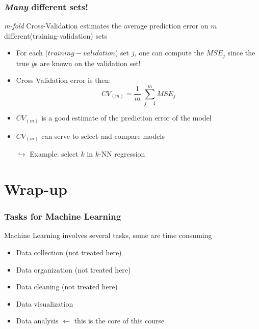 \documentclass[xcolor=x11names,compress, aspectratio=169]{beamer}
\renewcommand{\(}{\begin{columns}}
\renewcommand{\)}{\end{columns}}
\newcommand{\<}[1]{\begin{column}{#1}}
\renewcommand{\>}{\end{column}}
\begin{document}
\begin{frame}
\frametitle{\textcolor{brique}{\textit{Many} different sets!  }}
\textit{m-fold} Cross-Validation estimates the average prediction error on $m$ different(training-validation) sets
\pause
\begin{itemize}[<+->]
\item For each ($training-validation$) set $j$, one can compute the $MSE_j$ since the true $y$s are known on the validation set!
\item Cross Validation error is then:
 $$ CV_{(m)}  =  \frac{1}{m} \; \sum_ {j=1}^m   MSE_j$$
 \item $CV_{(m)}$ is a good estimate of the prediction error of the model
 \item  $CV_{(m)} $  can serve to select and compare models 
 \item[$\hookrightarrow$] Example: select  $k$ in $k$-NN regression
\end{itemize}
\end{frame}



\section{Wrap-up}

\begin{frame}
\frametitle{\textcolor{brique}{ Tasks for Machine Learning }}
Machine Learning involves several tasks, some are time consuming
\pause
\begin{itemize}[<+->]
    \item Data collection (not treated here)
    \item Data organization (not treated here)
    \item Data cleaning (not treated here)
    \item Data visualization
    \item Data analysis $ \leftarrow $ this is the core of this course
\end{itemize}
\end{frame}
\end{document}
